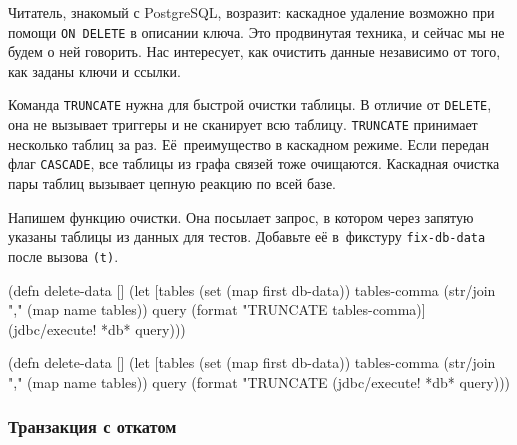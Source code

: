 
Читатель, знакомый с PostgreSQL, возразит: каскадное удаление возможно при
помощи \texttt{ON DELETE} в описании ключа. Это продвинутая техника, и сейчас
мы не будем о ней говорить. Нас интересует, как очистить данные независимо от
того, как заданы ключи и ссылки.


Команда \verb|TRUNCATE|  нужна для быстрой очистки таблицы. В
отличие от \verb|DELETE|, она не вызывает триггеры и не сканирует всю
таблицу. \verb|TRUNCATE| принимает несколько таблиц за раз. Её~преимущество в
каскадном режиме. Если передан флаг \verb|CASCADE|, все таблицы из графа связей
тоже очищаются. Каскадная очистка пары таблиц вызывает цепную реакцию по всей
базе.


Напишем функцию очистки. Она посылает запрос, в котором через запятую указаны
таблицы из данных для тестов. Добавьте её в~фикстуру
\verb|fix-db-data|  после вызова \verb|(t)|.

\ifnarrow

\begin{english}
  \begin{clojure}
(defn delete-data []
  (let [tables (set (map first db-data))
        tables-comma
        (str/join "," (map name tables))
        query
        (format "TRUNCATE %
          tables-comma)]
    (jdbc/execute! *db* query)))
  \end{clojure}
\end{english}

\else

\begin{english}
  \begin{clojure}
(defn delete-data []
  (let [tables (set (map first db-data))
        tables-comma (str/join "," (map name tables))
        query (format "TRUNCATE %
    (jdbc/execute! *db* query)))
  \end{clojure}
\end{english}

\fi

\subsubsection*{Транзакция с откатом}



